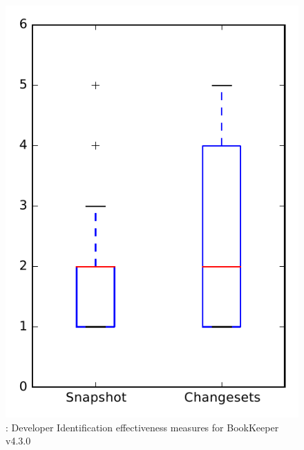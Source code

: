 
\begin{figure}
\centering
\includegraphics[height=0.4\textheight]{figures/dit/rq1_bookkeeper}
\caption{\done: Developer Identification effectiveness measures for BookKeeper v4.3.0}
\label{fig:dit:rq1:bookkeeper}
\end{figure}
